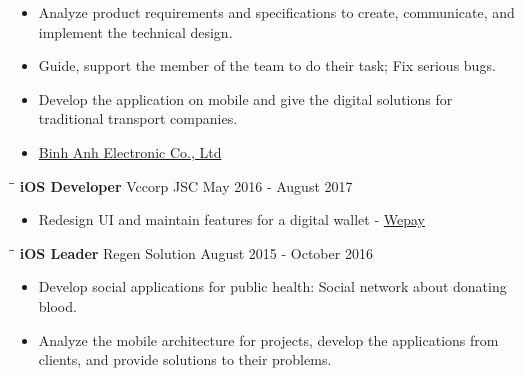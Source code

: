\documentclass[margin, 10pt]{res}
\begin{document}
\begin{resume}
   \begin{itemize}
		\item Analyze product requirements and specifications to create, communicate, and implement the technical design.
		\item Guide, support the member of the team to do their task; Fix serious bugs.
      \item Develop the application on mobile and give the digital solutions for traditional transport companies.
      \item {\color{blue}\href{https://itunes.apple.com/vn/developer/binh-anh-electronic-co-ltd/id1020602455?l=vi&mt=8}{Binh Anh Electronic Co., Ltd}}
   \end{itemize}

   \begin{tabbing}
   \hspace{2.0in}\= \hspace{2.0in}\= \kill %
   {\bf iOS Developer} \>Vccorp JSC \>May 2016 - August 2017\\
   \end{tabbing}\vspace{-20pt} %

   \begin{itemize}
      \item Redesign UI and maintain features for a digital wallet - 
      {\color{blue}\href{https://itunes.apple.com/au/app/vi-wepay/id1116328276?mt=8}{Wepay}}    \end{itemize}
   
   \begin{tabbing}
   \hspace{2.0in}\= \hspace{2.0in}\= \kill %
   {\bf iOS Leader} \>Regen Solution \>August 2015 - October 2016\\
   \end{tabbing}\vspace{-20pt} %

   \begin{itemize}
   	\item Develop social applications for public health: Social network about donating blood.
		\item Analyze the mobile architecture for projects, develop the applications from clients, and provide solutions to their problems.
   \end{itemize}


\end{resume}
\end{document}
